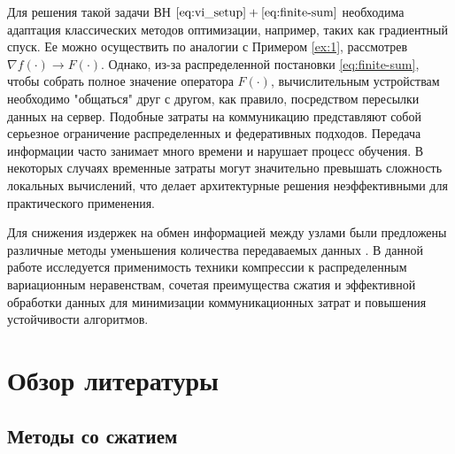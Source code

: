 \documentclass{ProcISPRAS}
\begin{document}
Для решения такой задачи ВН $\eqref{eq:vi_setup} + \eqref{eq:finite-sum}$ необходима адаптация классических методов оптимизации, например, таких как градиентный спуск. Ее можно осуществить по аналогии с Примером \ref{ex:1}, рассмотрев $\nabla f(\cdot)\rightarrow F(\cdot)$. Однако, из-за распределенной постановки \eqref{eq:finite-sum}, чтобы собрать полное значение оператора $F(\cdot)$, вычислительным устройствам необходимо "общаться" друг с другом, как правило, посредством пересылки данных на сервер. Подобные затраты на коммуникацию представляют собой серьезное ограничение распределенных и федеративных подходов. Передача информации часто занимает много времени и нарушает процесс обучения. В некоторых случаях временные затраты могут значительно превышать сложность локальных вычислений, что делает архитектурные решения неэффективными для практического применения. 

Для снижения издержек на обмен информацией между узлами были предложены различные методы уменьшения количества передаваемых данных \cite{kovalev2022optimal, medyakov2023optimal}. В данной работе исследуется применимость техники компрессии к распределенным вариационным неравенствам, сочетая преимущества сжатия и эффективной обработки данных для минимизации коммуникационных затрат и повышения устойчивости алгоритмов.

\section{Обзор литературы}

\subsection{Методы со сжатием}
\end{document}
